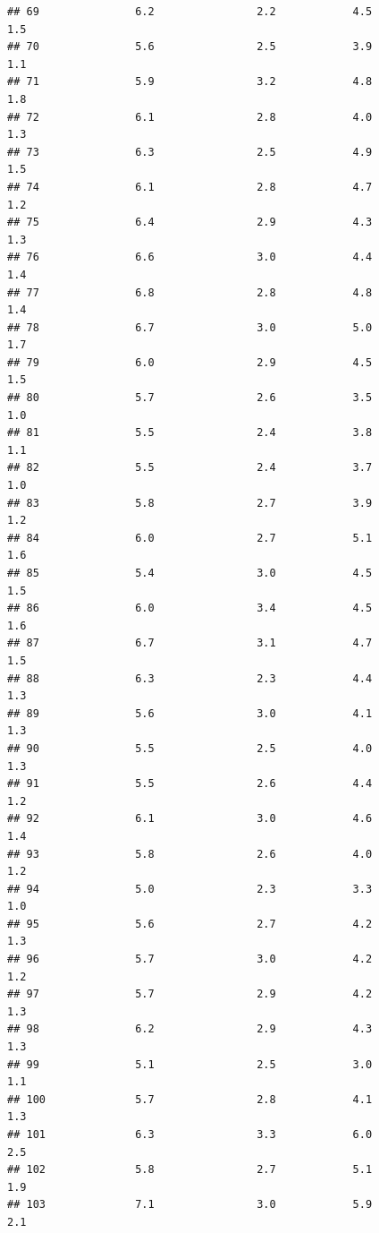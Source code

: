 \documentclass[
]{book}
\theoremstyle{plain}
\theoremstyle{definition}
\theoremstyle{definition}
\theoremstyle{definition}
\theoremstyle{definition}
\theoremstyle{definition}
\theoremstyle{remark}
\begin{document}
\begin{verbatim}
## 69               6.2                2.2            4.5              1.5
## 70               5.6                2.5            3.9              1.1
## 71               5.9                3.2            4.8              1.8
## 72               6.1                2.8            4.0              1.3
## 73               6.3                2.5            4.9              1.5
## 74               6.1                2.8            4.7              1.2
## 75               6.4                2.9            4.3              1.3
## 76               6.6                3.0            4.4              1.4
## 77               6.8                2.8            4.8              1.4
## 78               6.7                3.0            5.0              1.7
## 79               6.0                2.9            4.5              1.5
## 80               5.7                2.6            3.5              1.0
## 81               5.5                2.4            3.8              1.1
## 82               5.5                2.4            3.7              1.0
## 83               5.8                2.7            3.9              1.2
## 84               6.0                2.7            5.1              1.6
## 85               5.4                3.0            4.5              1.5
## 86               6.0                3.4            4.5              1.6
## 87               6.7                3.1            4.7              1.5
## 88               6.3                2.3            4.4              1.3
## 89               5.6                3.0            4.1              1.3
## 90               5.5                2.5            4.0              1.3
## 91               5.5                2.6            4.4              1.2
## 92               6.1                3.0            4.6              1.4
## 93               5.8                2.6            4.0              1.2
## 94               5.0                2.3            3.3              1.0
## 95               5.6                2.7            4.2              1.3
## 96               5.7                3.0            4.2              1.2
## 97               5.7                2.9            4.2              1.3
## 98               6.2                2.9            4.3              1.3
## 99               5.1                2.5            3.0              1.1
## 100              5.7                2.8            4.1              1.3
## 101              6.3                3.3            6.0              2.5
## 102              5.8                2.7            5.1              1.9
## 103              7.1                3.0            5.9              2.1

\end{verbatim}
\end{document}
